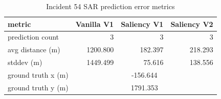 \begin{table}[ht]
\centering
\caption{Incident 54 SAR prediction error metrics}
\label{tab:sar-incident-54}
\begin{tabular}{lrrr}
\hline
metric & Vanilla V1 & Saliency V1 & Saliency V2 \\
\hline
prediction count & 3 & 3 & 3 \\
avg distance (m) & 1200.800 & 182.397 & 218.293 \\
stddev (m) & 1449.499 & 75.616 & 138.556 \\
ground truth x (m) & \multicolumn{3}{c}{-156.644} \\
ground truth y (m) & \multicolumn{3}{c}{1791.353} \\
\hline
\end{tabular}
\end{table}
